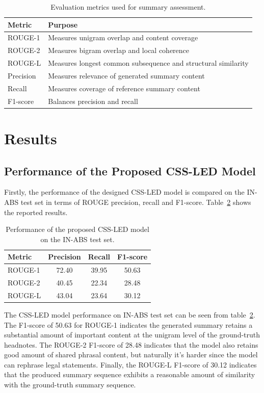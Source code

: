 \documentclass[11pt, a4paper]{article}
\theoremstyle{plain}%
\theoremstyle{remark}%
\theoremstyle{definition}%
\begin{document}
\begin{table}[H]
\centering
\caption{Evaluation metrics used for summary assessment.}
\begin{tabular}{ll}
\hline
Metric & Purpose \\
\hline
ROUGE-1 & Measures unigram overlap and content coverage \\
ROUGE-2 & Measures bigram overlap and local coherence \\
ROUGE-L & Measures longest common subsequence and structural similarity \\
Precision & Measures relevance of generated summary content \\
Recall & Measures coverage of reference summary content \\
F1-score & Balances precision and recall \\
\hline
\end{tabular}
\label{tab:evaluation_metrics}
\end{table}

\section{Results}
\subsection{Performance of the Proposed CSS-LED Model}

Firstly, the performance of the designed CSS-LED model is compared on the IN-ABS test set in terms of ROUGE precision, recall and F1-score. Table~\ref{tab:css_led_performance} shows the reported results.

\begin{table}[H]
\centering
\caption{Performance of the proposed CSS-LED model on the IN-ABS test set.}
\begin{tabular}{lccc}
\hline
Metric & Precision & Recall & F1-score \\
\hline
ROUGE-1 & 72.40 & 39.95 & 50.63 \\
ROUGE-2 & 40.45 & 22.34 & 28.48 \\
ROUGE-L & 43.04 & 23.64 & 30.12 \\
\hline
\end{tabular}
\label{tab:css_led_performance}
\end{table}

The CSS-LED model performance on IN-ABS test set can be seen from table~\ref{tab:css_led_performance}. The F1-score of 50.63 for ROUGE-1 indicates the generated summary retains a substantial amount of important content at the unigram level of the ground-truth headnotes. The ROUGE-2 F1-score of 28.48 indicates that the model also retains good amount of shared phrasal content, but naturally it’s harder since the model can rephrase legal statements. Finally, the ROUGE-L F1-score of 30.12 indicates that the produced summary sequence exhibits a reasonable amount of similarity with the ground-truth summary sequence.
\end{document}
